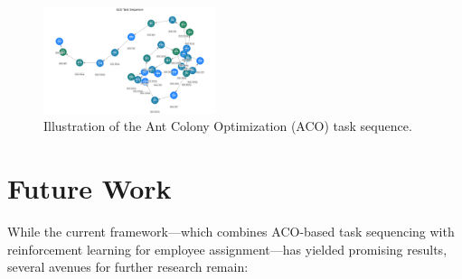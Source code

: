 \documentclass[%
aip,
cp,  %
amsmath,amssymb,
reprint,%
]{revtex4-2}
\begin{document}
	\begin{figure}
		\centering
		\includegraphics[width=0.45\textwidth]{figures/ACO_Task_Sequence.png}
		\caption{\label{fig:aco_sequence}Illustration of the Ant Colony Optimization (ACO) task sequence.}
	\end{figure}
	
	\section{\label{sec:future}Future Work}
	
	While the current framework—which combines ACO-based task sequencing with
	reinforcement learning for employee assignment—has yielded promising results, several
	avenues for further research remain:
	
\end{document}
